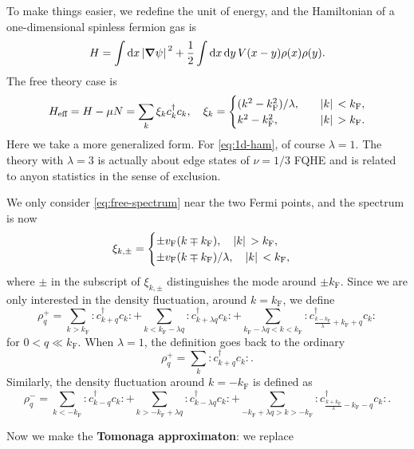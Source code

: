 \documentclass[hyperref, a4paper]{article}
\newcommand*{\normalorder}[1]{: #1 :}
\newcommand*{\concept}[1]{{\textbf{#1}}}
\begin{document}
To make things easier, we redefine the unit of energy, and the Hamiltonian of a one-dimensional spinless fermion gas is 
\begin{equation}
    H = \int \dd{x} \abs*{\grad{\psi}}^2 + \frac{1}{2} \int \dd{x} \dd{y} V(x - y) \rho(x) \rho(y). 
    \label{eq:1d-ham}
\end{equation}
The free theory case is 
\begin{equation}
    H_\text{eff} = H - \mu N = \sum_k \xi_k c^\dagger_k c_k, \quad \xi_k = \begin{cases}
        (k^2 - k_\text{F}^2) / \lambda, \quad &\abs*{k} < k_\text{F}, \\
        k^2 - k_\text{F}^2, \quad &\abs*{k} > k_\text{F}.
    \end{cases}
    \label{eq:free-spectrum}
\end{equation}
Here we take a more generalized form. For \eqref{eq:1d-ham}, of course $\lambda = 1$. 
The theory with $\lambda = 3$ is actually about edge states of $\nu = 1 /3$ FQHE and is related to anyon statistics in the sense of exclusion. %

We only consider \eqref{eq:free-spectrum} near the two Fermi points, and the spectrum is now 
\begin{equation}
    \xi_{k, \pm} = \begin{cases}
        \pm v_\text{F} (k \mp k_\text{F}), \quad \abs*{k} > k_\text{F}, \\
        \pm v_\text{F} (k \mp k_\text{F}) / \lambda, \quad \abs*{k} < k_\text{F},
    \end{cases}
\end{equation}
where $\pm$ in the subscript of $\xi_{k, \pm}$ distinguishes the mode around $\pm k_\text{F}$.
Since we are only interested in the density fluctuation, around $k = k_\text{F}$, we define 
\begin{equation}
    \rho^+_q = \sum_{k > k_\text{F}} \normalorder{c^\dagger_{k+q} c_k} 
    + \sum_{k < k_\text{F} - \lambda q} \normalorder{c^\dagger_{k + \lambda q} c_k} 
    + \sum_{k_\text{F} - \lambda q < k < k_\text{F} } \normalorder{c^\dagger_{\frac{k - k_\text{F}}{\lambda}  + k_\text{F} +q} c_k} 
\end{equation}
for $0 <q \ll k_\text{F}$. When $\lambda = 1$, the definition goes back to the ordinary 
\begin{equation}
    \rho^+_q = \sum_k \normalorder{c^\dagger_{k+q} c_k}.
\end{equation}
Similarly, the density fluctuation around $k = - k_\text{F}$ is defined as 
\begin{equation}
    \rho^-_q = \sum_{k < -k_\text{F}} \normalorder{c^\dagger_{k-q} c_k} 
    + \sum_{k > - k_\text{F} + \lambda q} \normalorder{c^\dagger_{k - \lambda q} c_k} 
    + \sum_{- k_\text{F} + \lambda q > k > - k_\text{F} } \normalorder{c^\dagger_{\frac{k + k_\text{F}}{\lambda} - k_\text{F} - q} c_k} .
\end{equation}

Now we make the \concept{Tomonaga approximaton}: we replace 



\end{document}
